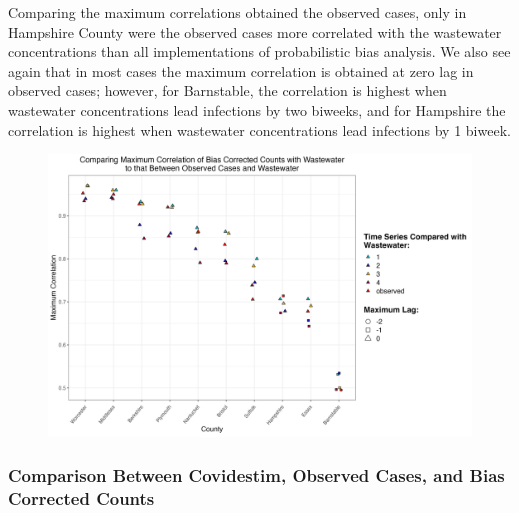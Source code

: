 \documentclass[12pt,twoside]{smiththesis}
\begin{document}
Comparing the maximum correlations obtained the observed cases, only in Hampshire County were the observed cases more correlated with the wastewater concentrations than all implementations of probabilistic bias analysis. We also see again that in most cases the maximum correlation is obtained at zero lag in observed cases; however, for Barnstable, the correlation is highest when wastewater concentrations lead infections by two biweeks, and for Hampshire the correlation is highest when wastewater concentrations lead infections by 1 biweek.
\begin{figure}
\includegraphics[width=1\linewidth]{figure/correlation_observed_pb} \caption{\label{fig:correlation_observed_pb}}\label{fig:unnamed-chunk-24}
\end{figure}
\hypertarget{comparison-between-covidestim-observed-cases-and-bias-corrected-counts}{%
\subsubsection{Comparison Between Covidestim, Observed Cases, and Bias Corrected Counts}\label{comparison-between-covidestim-observed-cases-and-bias-corrected-counts}}
\end{document}
